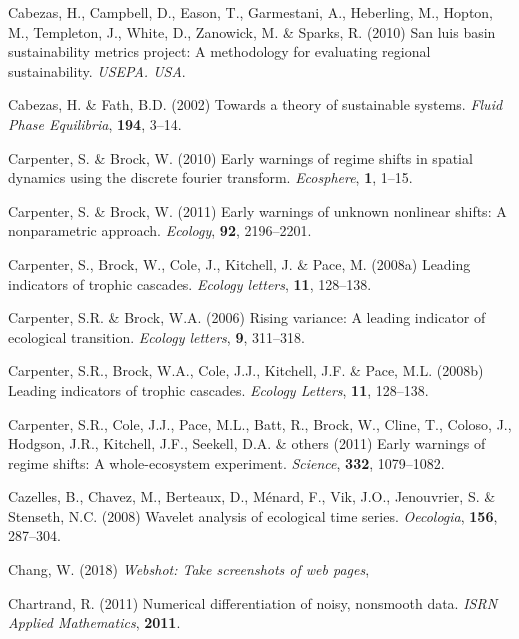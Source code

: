 \documentclass[print]{nuthesis}
\begin{document}
\leavevmode\hypertarget{ref-cabezas_san_2010}{}%
Cabezas, H., Campbell, D., Eason, T., Garmestani, A., Heberling, M., Hopton, M., Templeton, J., White, D., Zanowick, M. \& Sparks, R. (2010) San luis basin sustainability metrics project: A methodology for evaluating regional sustainability. \emph{USEPA. USA}.

\leavevmode\hypertarget{ref-cabezas_towards_2002}{}%
Cabezas, H. \& Fath, B.D. (2002) Towards a theory of sustainable systems. \emph{Fluid Phase Equilibria}, \textbf{194}, 3--14.

\leavevmode\hypertarget{ref-carpenter2010early}{}%
Carpenter, S. \& Brock, W. (2010) Early warnings of regime shifts in spatial dynamics using the discrete fourier transform. \emph{Ecosphere}, \textbf{1}, 1--15.

\leavevmode\hypertarget{ref-carpenterBrock2011early}{}%
Carpenter, S. \& Brock, W. (2011) Early warnings of unknown nonlinear shifts: A nonparametric approach. \emph{Ecology}, \textbf{92}, 2196--2201.

\leavevmode\hypertarget{ref-carpenter2008leading}{}%
Carpenter, S., Brock, W., Cole, J., Kitchell, J. \& Pace, M. (2008a) Leading indicators of trophic cascades. \emph{Ecology letters}, \textbf{11}, 128--138.

\leavevmode\hypertarget{ref-carpenter2006rising}{}%
Carpenter, S.R. \& Brock, W.A. (2006) Rising variance: A leading indicator of ecological transition. \emph{Ecology letters}, \textbf{9}, 311--318.

\leavevmode\hypertarget{ref-carpenter_leading_2008}{}%
Carpenter, S.R., Brock, W.A., Cole, J.J., Kitchell, J.F. \& Pace, M.L. (2008b) Leading indicators of trophic cascades. \emph{Ecology Letters}, \textbf{11}, 128--138.

\leavevmode\hypertarget{ref-carpenter2011early}{}%
Carpenter, S.R., Cole, J.J., Pace, M.L., Batt, R., Brock, W., Cline, T., Coloso, J., Hodgson, J.R., Kitchell, J.F., Seekell, D.A. \& others (2011) Early warnings of regime shifts: A whole-ecosystem experiment. \emph{Science}, \textbf{332}, 1079--1082.

\leavevmode\hypertarget{ref-cazelles2008wavelet}{}%
Cazelles, B., Chavez, M., Berteaux, D., Ménard, F., Vik, J.O., Jenouvrier, S. \& Stenseth, N.C. (2008) Wavelet analysis of ecological time series. \emph{Oecologia}, \textbf{156}, 287--304.

\leavevmode\hypertarget{ref-webshot}{}%
Chang, W. (2018) \emph{Webshot: Take screenshots of web pages},

\leavevmode\hypertarget{ref-chartrand2011numerical}{}%
Chartrand, R. (2011) Numerical differentiation of noisy, nonsmooth data. \emph{ISRN Applied Mathematics}, \textbf{2011}.
\end{document}
